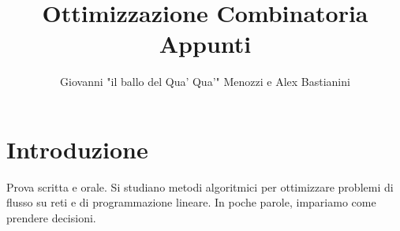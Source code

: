 \documentclass{report}
\title{\Huge{Ottimizzazione Combinatoria}\\Appunti}
\author{\huge{Giovanni "il ballo del Qua' Qua'" Menozzi e Alex Bastianini}}
\date{}
\begin{document}
\maketitle
\newpage%
\tableofcontents

\pagebreak

\chapter{Introduzione}
Prova scritta e orale. Si studiano metodi algoritmici per ottimizzare problemi di flusso su reti e di programmazione lineare. In poche parole, impariamo come prendere decisioni.


\end{document}
